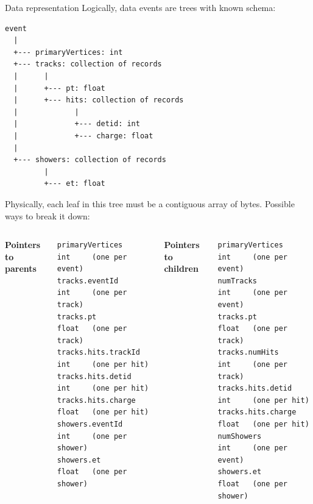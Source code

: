 \documentclass{beamer}
\begin{document}
\begin{frame}[fragile]{Data representation}
\vspace{0.5 cm}
Logically, data events are trees with known schema:
\tiny
\begin{center}
\begin{minipage}{0.5\linewidth}
\begin{verbatim}
event
  |
  +--- primaryVertices: int
  +--- tracks: collection of records
  |      |
  |      +--- pt: float
  |      +--- hits: collection of records
  |             |
  |             +--- detid: int
  |             +--- charge: float
  |
  +--- showers: collection of records
         |
         +--- et: float
\end{verbatim}
\end{minipage}
\end{center}

\normalsize
Physically, each leaf in this tree must be a contiguous array of bytes. Possible ways to break it down:

\vspace{0.25 cm}
\tiny
\begin{columns}
{\bf Pointers to parents}

\vspace{-0.35 cm}
\begin{verbatim}
primaryVertices      int     (one per event)
tracks.eventId       int     (one per track)
tracks.pt            float   (one per track)
tracks.hits.trackId  int     (one per hit)
tracks.hits.detid    int     (one per hit)
tracks.hits.charge   float   (one per hit)
showers.eventId      int     (one per shower)
showers.et           float   (one per shower)
\end{verbatim}

{\bf Pointers to children}

\vspace{-0.35 cm}
\begin{verbatim}
primaryVertices      int     (one per event)
numTracks            int     (one per event)
tracks.pt            float   (one per track)
tracks.numHits       int     (one per track)
tracks.hits.detid    int     (one per hit)
tracks.hits.charge   float   (one per hit)
numShowers           int     (one per event)
showers.et           float   (one per shower)
\end{verbatim}
\end{columns}
\end{frame}
\end{document}
